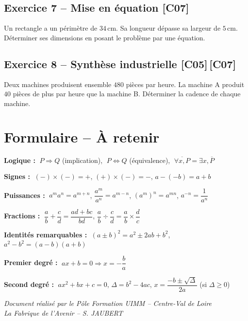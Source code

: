 \documentclass[a4paper,11pt]{article}
\begin{document}
\subsection*{Exercice 7 -- Mise en équation \hfill {\normalsize\color{uimmred}[C07]}}
Un rectangle a un périmètre de $34\,$cm. Sa longueur dépasse sa largeur de $5\,$cm. Déterminer ses dimensions en posant le problème par une équation.

\subsection*{Exercice 8 -- Synthèse industrielle \hfill {\normalsize\color{uimmred}[C05]\,[C07]}}
Deux machines produisent ensemble $480$ pièces par heure. La machine A produit $40$ pièces de plus par heure que la machine B. Déterminer la cadence de chaque machine.

\newpage
\section*{Formulaire -- À retenir}

\begin{tcolorbox}[colback=uimmlightblue, colframe=uimmblue, title={\textbf{Formulaire des calculs fondamentaux}}, fonttitle=\large\bfseries\sffamily, coltitle=white, boxrule=1.5pt, arc=5pt]

\textbf{Logique :}
$\;P \Rightarrow Q$ (implication), $\;P \Leftrightarrow Q$ (équivalence),
$\;\overline{\forall x, P} = \exists x, \overline{P}$

\vspace{6pt}
\textbf{Signes :} $\;(-)\times(-) = +$, \quad $(+)\times(-) = -$, \quad $a - (-b) = a + b$

\vspace{6pt}
\textbf{Puissances :} $\;a^m a^n = a^{m+n}$, \quad $\dfrac{a^m}{a^n} = a^{m-n}$, \quad $(a^m)^n = a^{mn}$, \quad $a^{-n} = \dfrac{1}{a^n}$

\vspace{6pt}
\textbf{Fractions :} $\;\dfrac{a}{b} + \dfrac{c}{d} = \dfrac{ad + bc}{bd}$, \quad $\dfrac{a}{b} \div \dfrac{c}{d} = \dfrac{a}{b} \times \dfrac{d}{c}$

\vspace{6pt}
\textbf{Identités remarquables :}
$\;(a \pm b)^2 = a^2 \pm 2ab + b^2$, \quad $a^2 - b^2 = (a-b)(a+b)$

\vspace{6pt}
\textbf{Premier degré :} $\;ax + b = 0 \Rightarrow x = -\dfrac{b}{a}$

\vspace{6pt}
\textbf{Second degré :} $\;ax^2 + bx + c = 0$, \quad $\Delta = b^2 - 4ac$, \quad $x = \dfrac{-b \pm \sqrt{\Delta}}{2a}$ (si $\Delta \geq 0$)
\end{tcolorbox}

\vfill
\begin{center}
\color{uimmgray}\small
\textit{Document réalisé par le Pôle Formation UIMM -- Centre-Val de Loire}\\
\textit{La Fabrique de l'Avenir -- S. JAUBERT}
\end{center}
\end{document}
